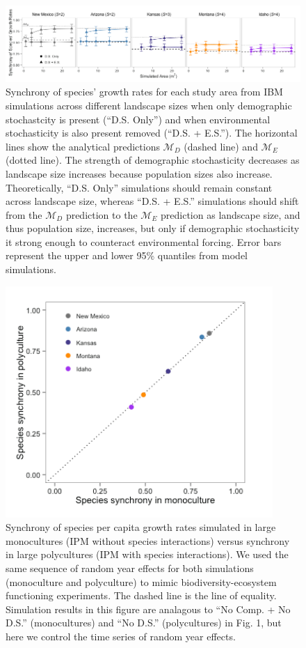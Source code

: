 \documentclass[12pt,]{article}
\begin{document}
\begin{figure}[!ht]
  \centering
      \includegraphics[width=6in]{./components/formatted_figures/formatted_figure2.png}
  \caption{Synchrony of species' growth rates for each study area from IBM simulations across different landscape sizes when only demographic stochastcity is present (``D.S. Only'') and when environmental stochasticity is also present removed (``D.S. + E.S.''). The horizontal lines show the analytical predictions $\mathcal{M}_D$ (dashed line) and $\mathcal{M}_E$ (dotted line). The strength of demographic stochasticity decreases as landscape size increases because population sizes also increase. Theoretically, ``D.S. Only'' simulations should remain constant across landscape size, whereas ``D.S. + E.S.'' simulations should shift from the $\mathcal{M}_D$ prediction to the $\mathcal{M}_E$ prediction as landscape size, and thus population size, increases, but only if demographic stochasticity it strong enough to counteract environmental forcing. Error bars represent the upper and lower 95\% quantiles from model simulations.}
\end{figure}

\pagebreak{}

\begin{figure}[!ht]
  \centering
      \includegraphics[width=4in]{./components/formatted_figures/formatted_figure3.png}
  \caption{Synchrony of species per capita growth rates simulated in large monocultures (IPM without species interactions) versus synchrony in large polycultures (IPM with species interactions). We used the same sequence of random year effects for both simulations (monoculture and polyculture) to mimic biodiversity-ecosystem functioning experiments. The dashed line is the line of equality. Simulation results in this figure are analagous to ``No Comp. + No D.S.'' (monocultures) and ``No D.S.'' (polycultures) in Fig. 1, but here we control the time series of random year effects.}
\end{figure}
\end{document}
